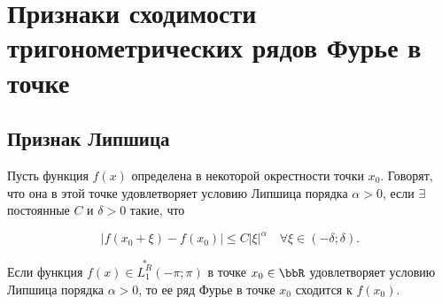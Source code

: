 \section{Признаки сходимости тригонометрических рядов Фурье в точке}
\subsection{Признак Липшица}

Пусть функция $f(x)$ определена в некоторой окрестности точки $x_0$. Говорят, что она в этой точке удовлетворяет $\textit{условию Липшица порядка } \alpha > 0$, если $\exists$ постоянные $C$ и $\delta > 0$ такие, что 

\begin{equation} \label{ch17eq4}
|f(x_0 + \xi) - f(x_0)| \le C |\xi|^\alpha \quad \forall \xi \in (-\delta; \delta).
\end{equation}

\begin{thm}  \label{ch17thm3}
Если функция $f(x) \in \overset{*}{L^{R}_1}(-\pi;\pi)$ в точке $x_0 \in \bbR$ удовлетворяет условию Липшица порядка $\alpha > 0$, то ее ряд Фурье в точке $x_0$ сходится к $f(x_0)$.
\end{thm}

